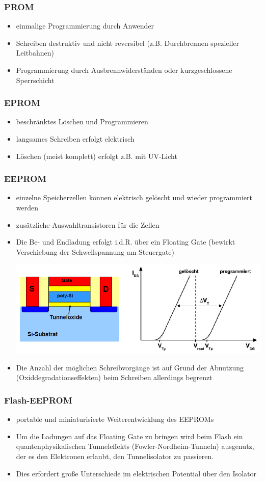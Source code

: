 	\subsubsection{PROM}
		\begin{itemize}
			\item einmalige Programmierung durch Anwender
			\item Schreiben destruktiv und nicht reversibel (z.B. Durchbrennen spezieller Leitbahnen)
			\item Programmierung durch Ausbrennwiderständen oder kurzgeschlossene Sperrschicht
		\end{itemize}
	\subsubsection{EPROM}
		\begin{itemize}
			\item beschränktes Löschen und Programmieren
			\item langsames Schreiben erfolgt elektrisch
			\item  Löschen (meist komplett) erfolgt z.B. mit UV-Licht
		\end{itemize}
	\subsubsection{EEPROM}
		\begin{itemize}
			\item einzelne Speicherzellen können elektrisch gelöscht und wieder programmiert werden		
			\item zusätzliche Auswahltransistoren für die Zellen
			\item Die Be- und Endladung erfolgt i.d.R. über ein Floating Gate (bewirkt Verschiebung der Schwellspannung am Steuergate)
			\begin{center}
				\includegraphics[width=0.5\linewidth]{Kapitel/Kap07/FloatingGate}
			\end{center}
			\item Die Anzahl der möglichen Schreibvorgänge ist auf Grund der Abnutzung (Oxiddegradationseffekten) beim Schreiben allerdings begrenzt
		\end{itemize}
	\subsubsection{Flash-EEPROM}
		\begin{itemize}
			\item portable und miniaturisierte Weiterentwicklung des EEPROMs
			\item Um die Ladungen auf das Floating Gate zu bringen wird beim Flash ein quantenphysikalischen
			Tunneleffekts (Fowler-Nordheim-Tunneln) ausgenutz, der es den Elektronen erlaubt, den Tunnelisolator zu passieren.
			\item Dies erfordert große Unterschiede im elektrischen Potential über den Isolator
		\end{itemize}
